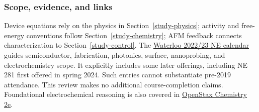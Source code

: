 \subsubsection{Scope, evidence, and links}
Device equations rely on the physics in Section~\ref{study-physics}; activity and free-energy conventions follow Section~\ref{study-chemistry}; AFM feedback connects characterization to Section~\ref{study-control}. The \href{https://ucalendar.uwaterloo.ca/2223/COURSE/course-NE.html}{Waterloo 2022/23 NE calendar} guides semiconductor, fabrication, photonics, surface, nanoprobing, and electrochemistry scope. It explicitly includes some later offerings, including NE 281 first offered in spring 2024. Such entries cannot substantiate pre-2019 attendance. This review makes no additional course-completion claims. Foundational electrochemical reasoning is also covered in \href{https://openstax.org/details/books/chemistry-2e}{OpenStax Chemistry 2e}.